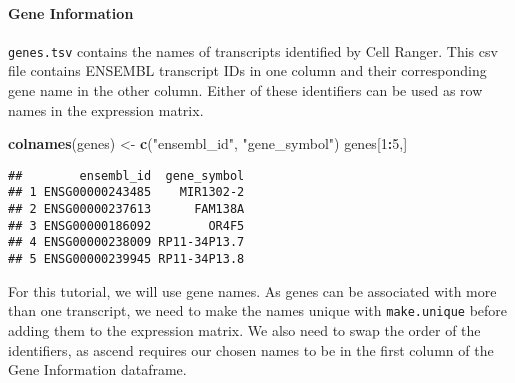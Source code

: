 \documentclass[]{article}
\newenvironment{Shaded}{\begin{snugshade}}{\end{snugshade}}
\newcommand{\DecValTok}[1]{\textcolor[rgb]{0.00,0.00,0.81}{#1}}
\newcommand{\KeywordTok}[1]{\textcolor[rgb]{0.13,0.29,0.53}{\textbf{#1}}}
\newcommand{\NormalTok}[1]{#1}
\newcommand{\OperatorTok}[1]{\textcolor[rgb]{0.81,0.36,0.00}{\textbf{#1}}}
\newcommand{\StringTok}[1]{\textcolor[rgb]{0.31,0.60,0.02}{#1}}
\let\oldparagraph\paragraph
\renewcommand{\paragraph}[1]{\oldparagraph{#1}\mbox{}}
\begin{document}
\hypertarget{gene-information}{%
\paragraph{Gene Information}\label{gene-information}}

\texttt{genes.tsv} contains the names of transcripts identified by Cell
Ranger. This csv file contains ENSEMBL transcript IDs in one column and
their corresponding gene name in the other column. Either of these
identifiers can be used as row names in the expression matrix.

\begin{Shaded}
\begin{Highlighting}[]
\KeywordTok{colnames}\NormalTok{(genes) <-}\StringTok{ }\KeywordTok{c}\NormalTok{(}\StringTok{"ensembl_id"}\NormalTok{, }\StringTok{"gene_symbol"}\NormalTok{)}
\NormalTok{genes[}\DecValTok{1}\OperatorTok{:}\DecValTok{5}\NormalTok{,]}
\end{Highlighting}
\end{Shaded}

\begin{verbatim}
##        ensembl_id  gene_symbol
## 1 ENSG00000243485    MIR1302-2
## 2 ENSG00000237613      FAM138A
## 3 ENSG00000186092        OR4F5
## 4 ENSG00000238009 RP11-34P13.7
## 5 ENSG00000239945 RP11-34P13.8
\end{verbatim}

For this tutorial, we will use gene names. As genes can be associated
with more than one transcript, we need to make the names unique with
\texttt{make.unique} before adding them to the expression matrix. We
also need to swap the order of the identifiers, as ascend requires our
chosen names to be in the first column of the Gene Information
dataframe.

\begin{Shaded}
\end{Shaded}
\end{document}
